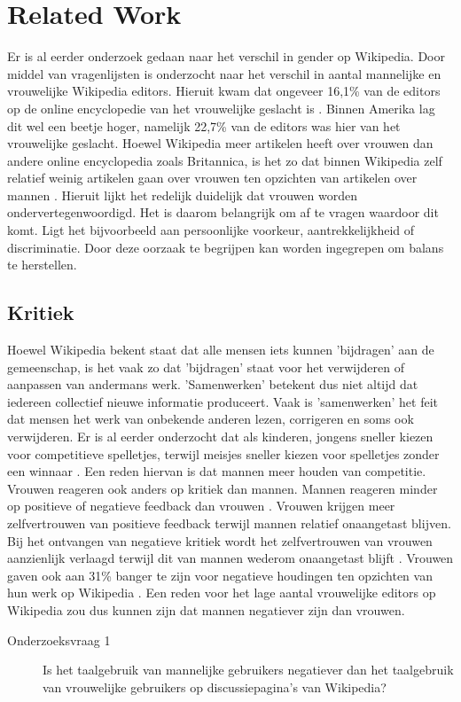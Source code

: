 \section{Related Work}
\label{sec:rel}

Er is al eerder onderzoek gedaan naar het verschil in gender op Wikipedia. Door middel van vragenlijsten is onderzocht naar het verschil in aantal mannelijke en vrouwelijke Wikipedia editors. Hieruit kwam dat ongeveer 16,1\% van de editors op de online encyclopedie van het vrouwelijke geslacht is \citep{hill2013wikipedia}. Binnen Amerika lag dit wel een beetje hoger, namelijk 22,7\% van de editors was hier van het vrouwelijke geslacht. Hoewel Wikipedia meer artikelen heeft over vrouwen dan andere online encyclopedia zoals Britannica, is het zo dat binnen Wikipedia zelf relatief weinig artikelen gaan over vrouwen ten opzichten van artikelen over mannen \citep{reagle2011gender}. Hieruit lijkt het redelijk duidelijk dat vrouwen worden ondervertegenwoordigd. Het is daarom belangrijk om af te vragen waardoor dit komt. Ligt het bijvoorbeeld aan persoonlijke voorkeur, aantrekkelijkheid of discriminatie. Door deze oorzaak te begrijpen kan worden ingegrepen om balans te herstellen. 

\subsection{Kritiek}
Hoewel Wikipedia bekent staat dat alle mensen iets kunnen 'bijdragen' aan de gemeenschap, is het vaak zo dat 'bijdragen' staat voor het verwijderen of aanpassen van andermans werk. 'Samenwerken' betekent dus niet altijd dat iedereen collectief nieuwe informatie produceert. Vaak is 'samenwerken' het feit dat mensen het werk van onbekende anderen lezen, corrigeren en soms ook verwijderen. Er is al eerder onderzocht dat als kinderen, jongens sneller kiezen voor competitieve spelletjes, terwijl meisjes sneller kiezen voor spelletjes zonder een winnaar \citep{campbell2013mind}. Een reden hiervan is dat mannen meer houden van competitie. Vrouwen reageren ook anders op kritiek dan mannen. Mannen reageren minder op positieve of negatieve feedback dan vrouwen \citep{roberts1994gender}. Vrouwen krijgen meer zelfvertrouwen van positieve feedback terwijl mannen relatief onaangetast blijven. Bij het ontvangen van negatieve kritiek wordt het zelfvertrouwen van vrouwen aanzienlijk verlaagd terwijl dit van mannen wederom onaangetast blijft \citep{roberts1994gender}. Vrouwen gaven ook aan 31\% banger te zijn voor negatieve houdingen ten opzichten van hun werk op Wikipedia \citep{collier2012conflict}. Een reden voor het lage aantal vrouwelijke editors op Wikipedia zou dus kunnen zijn dat mannen negatiever zijn dan vrouwen. 
\begin{description}
\item[Onderzoeksvraag 1] Is het taalgebruik van mannelijke gebruikers negatiever dan het taalgebruik van vrouwelijke gebruikers op discussiepagina's van Wikipedia?
\end{description}

